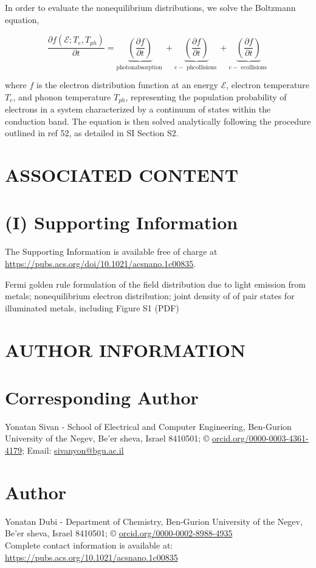 \documentclass[10pt]{article}
\begin{document}
In order to evaluate the nonequilibrium distributions, we solve the Boltzmann equation,


\begin{equation*}
\frac{\partial f\left(\mathcal{E} ; T_{e}, T_{p h}\right)}{\partial t}=\underbrace{\left(\frac{\partial f}{\partial t}\right)}_{\text {photonabsorption }}+\underbrace{\left(\frac{\partial f}{\partial t}\right)}_{e-\text { phcollisions }}+\underbrace{\left(\frac{\partial f}{\partial t}\right)}_{e-\text { ecollisions }} \tag{11}
\end{equation*}


where $f$ is the electron distribution function at an energy $\mathcal{E}$, electron temperature $T_{e}$, and phonon temperature $T_{p h}$, representing the population probability of electrons in a system characterized by a continuum of states within the conduction band. The equation is then solved analytically following the procedure outlined in ref 52, as detailed in SI Section S2.

\section*{ASSOCIATED CONTENT}
\section*{(I) Supporting Information}
The Supporting Information is available free of charge at \href{https://pubs.acs.org/doi/10.1021/acsnano.1c00835}{https://pubs.acs.org/doi/10.1021/acsnano.1c00835}.

Fermi golden rule formulation of the field distribution due to light emission from metals; nonequilibrium electron distribution; joint density of of pair states for illuminated metals, including Figure S1 (PDF)

\section*{AUTHOR INFORMATION}
\section*{Corresponding Author}
Yonatan Sivan - School of Electrical and Computer Engineering, Ben-Gurion University of the Negev, Be'er sheva, Israel 8410501; © \href{http://orcid.org/0000-0003-4361-4179;}{orcid.org/0000-0003-4361-4179;} Email: \href{mailto:sivanyon@bgu.ac.il}{sivanyon@bgu.ac.il}

\section*{Author}
Yonatan Dubi - Department of Chemistry, Ben-Gurion University of the Negev, Be'er sheva, Israel 8410501; © \href{http://orcid.org/0000-0002-8988-4935}{orcid.org/0000-0002-8988-4935}\\
Complete contact information is available at:\\
\href{https://pubs.acs.org/10.1021/acsnano.1c00835}{https://pubs.acs.org/10.1021/acsnano.1c00835}
\end{document}
